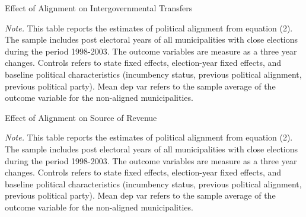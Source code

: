 \documentclass[dv_diss_main.tex]{subfiles}
\begin{document}
\begin{table}[h]
    \small
    \begin{center}
        \caption{Effect of Alignment on Intergovernmental Transfers}\label{tab:1trans} 
        \resizebox{\textwidth}{!}{}
    \end{center}
    \begin{tablenotes}
    \vspace{0.5em}
    \footnotesize	
	\textit{Note. }This table reports the estimates of political alignment from equation (2). The sample includes post electoral years of all municipalities with close elections during the period 1998-2003. The outcome variables are measure as a three year changes. Controls refers to state fixed effects, election-year fixed effects, and baseline political characteristics (incumbency status, previous political alignment, previous political party). Mean dep var refers to the sample average of the outcome variable for the non-aligned municipalities.
    \end{tablenotes}
\end{table}

\newpage

\begin{table}[h]
    \small
    \begin{center}
        \caption{{Effect of Alignment on Source of Revenue}}\label{tab:2revenues}
        \resizebox{\textwidth}{!}{}
    \end{center}
    \begin{tablenotes}
    \vspace{0.5em}
    \footnotesize
	\textit{Note. }This table reports the estimates of political alignment from equation (2). The sample includes post electoral years of all municipalities with close elections during the period 1998-2003. The outcome variables are measure as a three year changes. Controls refers to state fixed effects, election-year fixed effects, and baseline political characteristics (incumbency status, previous political alignment, previous political party). Mean dep var refers to the sample average of the outcome variable for the non-aligned municipalities.
    \end{tablenotes}
    
\end{table}     

\newpage
\end{document}
